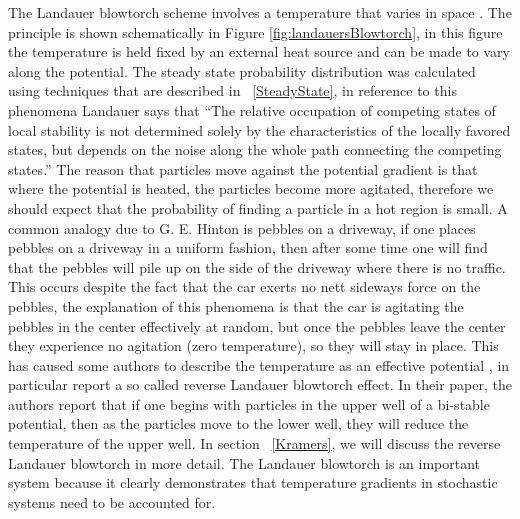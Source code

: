 The Landauer blowtorch scheme involves a temperature that varies in space \cite{Landauer1988}. The principle is shown schematically in Figure \ref{fig:landauersBlowtorch}, in this figure the temperature is held fixed by an external heat source and can be made to vary along the potential. The steady state probability distribution was calculated using techniques that are described in ~\autoref{SteadyState}, in reference to this phenomena Landauer says that \cite{Landauer1988}  ``The relative occupation of competing states of local stability is not determined solely by the characteristics of the locally favored states, but depends on the noise along the whole path connecting the competing states.'' The reason that particles move against the potential gradient is that where the potential is heated, the particles become more agitated, therefore we should expect that the probability of finding a particle in a hot region is small. A common analogy due to G. E. Hinton is pebbles on a driveway, if one places pebbles on a driveway in a uniform fashion, then after some time one will find that the pebbles will pile up on the side of the driveway where there is no traffic. This occurs despite the fact that the car exerts no nett sideways force on the pebbles, the explanation of this phenomena is that the car is agitating the pebbles in the center effectively at random, but once the pebbles leave the center they experience no agitation (zero temperature), so they will stay in place. This has caused some authors to describe the temperature as an effective potential \cite{Gardiner2009, Kampen1988}, in particular \cite{DasDasBarikEtAl2015} report a so called reverse Landauer blowtorch effect. In their paper, the authors report that if one begins with particles in the upper well of a bi-stable potential, then as the particles move to the lower well, they will reduce the temperature of the upper well. In section ~\autoref{Kramers}, we will discuss the reverse Landauer blowtorch in more detail. The Landauer blowtorch is an important system because it clearly demonstrates that temperature gradients in stochastic systems need to be accounted for.

